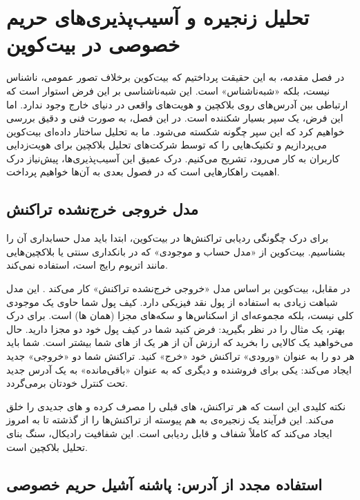 \chapter{تحلیل زنجیره و آسیب‌پذیری‌های حریم خصوصی در بیت‌کوین}
\label{chap:analysis_vulnerabilities}

در فصل مقدمه، به این حقیقت پرداختیم که بیت‌کوین برخلاف تصور عمومی، ناشناس نیست، بلکه «شبه‌ناشناس» است. این شبه‌ناشناسی بر این فرض استوار است که ارتباطی بین آدرس‌های روی بلاکچین و هویت‌های واقعی در دنیای خارج وجود ندارد. اما این فرض، یک سپر بسیار شکننده است. در این فصل، به صورت فنی و دقیق بررسی خواهیم کرد که این سپر چگونه شکسته می‌شود. ما به تحلیل ساختار داده‌ای بیت‌کوین می‌پردازیم و تکنیک‌هایی را که توسط شرکت‌های تحلیل بلاکچین برای هویت‌زدایی کاربران به کار می‌رود، تشریح می‌کنیم. درک عمیق این آسیب‌پذیری‌ها، پیش‌نیاز درک اهمیت راهکارهایی است که در فصول بعدی به آن‌ها خواهیم پرداخت.

\section{مدل خروجی خرج‌نشده تراکنش}

برای درک چگونگی ردیابی تراکنش‌ها در بیت‌کوین، ابتدا باید مدل حسابداری آن را بشناسیم. بیت‌کوین از «مدل حساب و موجودی» که در بانکداری سنتی یا بلاکچین‌هایی مانند اتریوم رایج است، استفاده نمی‌کند.

در مقابل، بیت‌کوین بر اساس مدل «خروجی خرج‌نشده تراکنش» کار می‌کند \cite{antonopoulos_mastering}. این مدل شباهت زیادی به استفاده از پول نقد فیزیکی دارد. کیف پول شما حاوی یک موجودی کلی نیست، بلکه مجموعه‌ای از اسکناس‌ها و سکه‌های مجزا (همان ها) است. برای درک بهتر، یک مثال را در نظر بگیرید:
فرض کنید شما در کیف پول خود دو  مجزا دارید. حال می‌خواهید یک کالایی را بخرید که ارزش آن از هر یک از های شما بیشتر است. شما باید هر دو  را به عنوان «ورودی» تراکنش خود «خرج» کنید. تراکنش شما دو «خروجی» جدید ایجاد می‌کند: یکی برای فروشنده و دیگری که به عنوان «باقی‌مانده» به یک آدرس جدید تحت کنترل خودتان برمی‌گردد.

نکته کلیدی این است که هر تراکنش، های قبلی را مصرف کرده و های جدیدی را خلق می‌کند. این فرآیند یک زنجیره‌ی به هم پیوسته از تراکنش‌ها را از گذشته تا به امروز ایجاد می‌کند که کاملاً شفاف و قابل ردیابی است. این شفافیت رادیکال، سنگ بنای تحلیل بلاکچین است.

\section{استفاده مجدد از آدرس: پاشنه آشیل حریم خصوصی}

